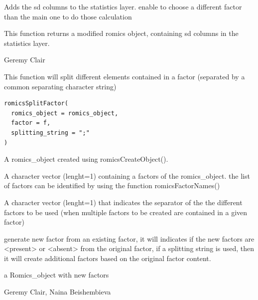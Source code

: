 \documentclass[a4paper]{book}
\begin{document}
%
\begin{Details}
Adds the sd columns to the statistics layer. enable to choose a different factor than the main one to do those calculation
\end{Details}
%
\begin{Value}
This function returns a modified romics object, containing sd columns in the statistics layer.
\end{Value}
%
\begin{Author}
Geremy Clair
\end{Author}
%
\begin{Description}
This function will split different elements contained in a factor (separated by a common separating character string)
\end{Description}
%
\begin{Usage}
\begin{verbatim}
romicsSplitFactor(
  romics_object = romics_object,
  factor = f,
  splitting_string = ";"
)
\end{verbatim}
\end{Usage}
%
\begin{Arguments}
\begin{ldescription}
\item[\code{romics\_object}] A romics\_object created using romicsCreateObject().

\item[\code{factor}] A character vector (lenght=1) containing a factors of the romics\_object. the list of factors can be identified by using the function romicsFactorNames()

\item[\code{splitting\_string}] A character vector (lenght=1) that indicates the separator of the the different factors to be used (when multiple factors to be created are contained in a given factor)
\end{ldescription}
\end{Arguments}
%
\begin{Details}
generate new factor from an existing factor, it will indicates if the new factors are <present> or <absent> from the original factor, if a splitting string is used, then it will create additional factors based on the original factor content.
\end{Details}
%
\begin{Value}
a Romics\_object with new factors
\end{Value}
%
\begin{Author}
Geremy Clair, Naina Beishembieva
\end{Author}
\end{document}
